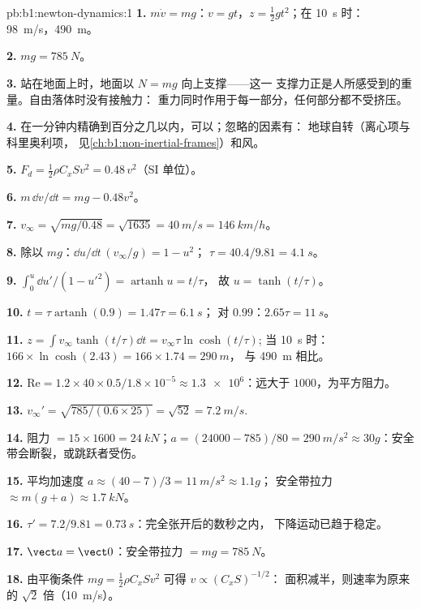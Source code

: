 \begin{solution}{pb:b1:newton-dynamics:1}
\textbf{1.} $m\dot v = mg$：$v = gt$，$z = \tfrac12 gt^2$；在 \qty{10}{s} 时：
\qty{98}{m/s}，\qty{490}{m}。

\textbf{2.} $mg = \qty{785}{N}$。

\textbf{3.} 站在地面上时，地面以 $N = mg$ 向上支撑——这一
支撑力正是人所感受到的重量。自由落体时没有接触力：
重力同时作用于每一部分，任何部分都不受挤压。

\textbf{4.} 在一分钟内精确到百分之几以内，可以；忽略的因素有：
地球自转（离心项与科里奥利项，
见\cref{ch:b1:non-inertial-frames}）和风。

\textbf{5.} $F_d = \tfrac12\rho C_xSv^2 = 0.48\,v^2$（SI 单位）。

\textbf{6.} $m\,\dd v/\dd t = mg - 0.48v^2$。

\textbf{7.} $v_\infty = \sqrt{mg/0.48} = \sqrt{1635} = \qty{40}{m/s} =
\qty{146}{km/h}$。

\textbf{8.} 除以 $mg$：$\dd u/\dd t\,(v_\infty/g) = 1 - u^2$；
$\tau = 40.4/9.81 = \qty{4.1}{s}$。

\textbf{9.} $\int_0^u\dd u'/(1 - u'^2) = \operatorname{artanh}u = t/\tau$，
故 $u = \tanh(t/\tau)$。

\textbf{10.} $t = \tau\operatorname{artanh}(0.9) = 1.47\tau = \qty{6.1}{s}$；
对 $0.99$：$2.65\tau = \qty{11}{s}$。

\textbf{11.} $z = \int v_\infty\tanh(t/\tau)\dd t = v_\infty\tau\ln\cosh(t/\tau)$;
当 \qty{10}{s} 时：$166 \times \ln\cosh(2.43) = 166 \times 1.74 = \qty{290}{m}$，
与 \qty{490}{m} 相比。

\textbf{12.} $\mathrm{Re} = 1.2 \times 40 \times 0.5/1.8\times10^{-5} \approx
\num{1.3e6}$：远大于 $1000$，为平方阻力。

\textbf{13.} $v_\infty' = \sqrt{785/(0.6 \times 25)} = \sqrt{52} = \qty{7.2}{m/s}$.

\textbf{14.} 阻力 $= 15 \times 1600 = \qty{24}{kN}$；$a = (24000 - 785)/80
= \qty{290}{m/s^2} \approx 30g$：安全带会断裂，或跳跃者受伤。

\textbf{15.} 平均加速度 $a \approx (40 - 7)/3 = \qty{11}{m/s^2} \approx 1.1g$；
安全带拉力 $\approx m(g + a) \approx \qty{1.7}{kN}$。

\textbf{16.} $\tau' = 7.2/9.81 = \qty{0.73}{s}$：完全张开后的数秒之内，
下降运动已趋于稳定。

\textbf{17.} $\vect a = \vect 0$：安全带拉力 $= mg = \qty{785}{N}$。

\textbf{18.} 由平衡条件 $mg = \tfrac12\rho C_xSv^2$ 可得 $v \propto (C_xS)^{-1/2}$：
面积减半，则速率为原来的 $\sqrt2$ 倍（\qty{10}{m/s}）。


\end{solution}
